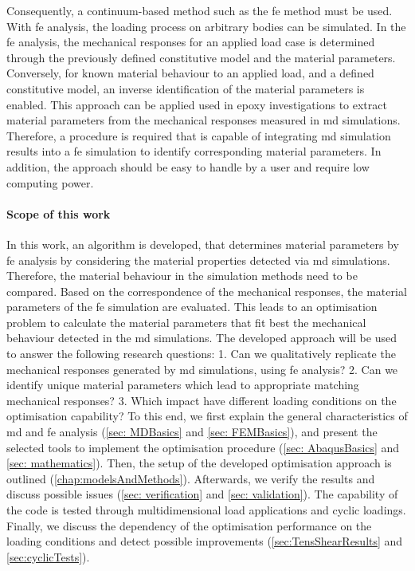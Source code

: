 Consequently, a continuum-based method such as the \acrfull{fe} method must be used. With \acrshort{fe} analysis, the loading process on arbitrary bodies can be simulated.
In the \acrshort{fe} analysis, the mechanical responses for an applied load case is determined through the previously defined constitutive model and the material parameters.
Conversely, for known material behaviour to an applied load, and a defined constitutive model, an inverse identification of the material parameters is enabled.
This approach can be applied used in epoxy investigations to extract material parameters from the mechanical responses measured in \acrshort{md} simulations.
Therefore, a procedure is required that is capable of integrating \acrshort{md} simulation results into a \acrshort{fe} simulation to identify corresponding material parameters. 
In addition, the approach should be easy to handle by a user and require low computing power.

\paragraph{Scope of this work}
In this work, an algorithm is developed, that determines material parameters by \acrshort{fe} analysis by considering the material properties detected via \acrshort{md} simulations. Therefore, the material behaviour in the simulation methods need to be compared.
Based on the correspondence of the mechanical responses, the material parameters of the \acrshort{fe} simulation are evaluated.
This leads to an optimisation problem to calculate the material parameters that fit best the mechanical behaviour detected in the \acrshort{md} simulations.
The developed approach will be used to answer the following research questions: 1. Can we qualitatively replicate the mechanical responses generated by \acrshort{md} simulations, using \acrshort{fe} analysis? 2. Can we identify unique material parameters which lead to appropriate matching mechanical responses? 3. Which impact have different loading conditions on the optimisation capability? 
To this end, we first explain the general characteristics of \acrshort{md} and \acrshort{fe} analysis (\autoref{sec: MDBasics} and \autoref{sec: FEMBasics}), and present the selected tools to implement the optimisation procedure (\autoref{sec: AbaqusBasics} and \autoref{sec: mathematics}). Then, the setup of the developed optimisation approach is outlined (\autoref{chap:modelsAndMethods}). Afterwards, we verify the results and discuss possible issues (\autoref{sec: verification} and \autoref{sec: validation}). The capability of the code is tested through multidimensional load applications and cyclic loadings. Finally, we discuss the dependency of the optimisation performance on the loading conditions and detect possible improvements (\autoref{sec:TensShearResults} and \autoref{sec:cyclicTests}).


